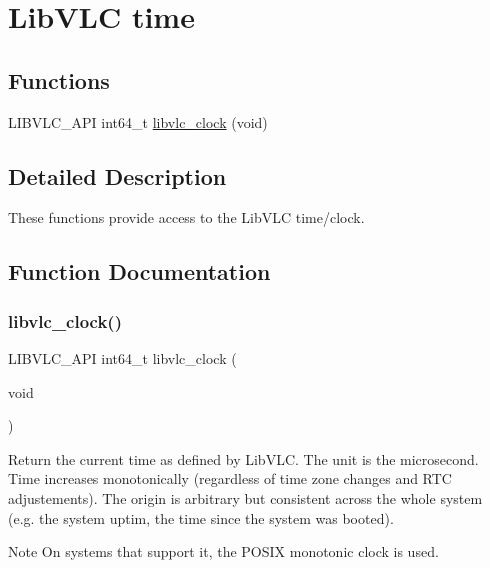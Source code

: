 \hypertarget{group__libvlc__clock}{}\section{Lib\+V\+LC time}
\label{group__libvlc__clock}
\subsection*{Functions}
\begin{DoxyCompactItemize}
\item 
L\+I\+B\+V\+L\+C\+\_\+\+A\+PI int64\+\_\+t \hyperlink{group__libvlc__clock_ga38fa16aeec0d1e6a7d872526200f1957}{libvlc\+\_\+clock} (void)
\end{DoxyCompactItemize}


\subsection{Detailed Description}
These functions provide access to the Lib\+V\+LC time/clock. 

\subsection{Function Documentation}
\mbox{\label{group__libvlc__clock_ga38fa16aeec0d1e6a7d872526200f1957}} 
\subsubsection{\texorpdfstring{libvlc\+\_\+clock()}{libvlc\_clock()}}
{\footnotesize\ttfamily L\+I\+B\+V\+L\+C\+\_\+\+A\+PI int64\+\_\+t libvlc\+\_\+clock (\begin{DoxyParamCaption}\item[{void}]{ }\end{DoxyParamCaption})}

Return the current time as defined by Lib\+V\+LC. The unit is the microsecond. Time increases monotonically (regardless of time zone changes and R\+TC adjustements). The origin is arbitrary but consistent across the whole system (e.\+g. the system uptim, the time since the system was booted). \begin{DoxyNote}{Note}
On systems that support it, the P\+O\+S\+IX monotonic clock is used. 
\end{DoxyNote}
